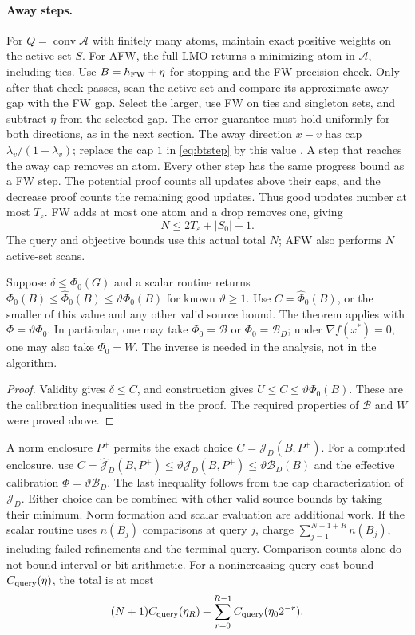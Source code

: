 \paragraph{Away steps.}\label{alg:afw}
For $Q=\operatorname{conv}\mathcal A$ with finitely many atoms, maintain
exact positive weights on the active set $S$.
For AFW, the full LMO returns a minimizing atom in $\mathcal A$, including ties.
Use $B=h_{\rm FW}+\eta$ for stopping and the FW precision check.
Only after that check passes,
scan the active set and compare its approximate away gap with the FW gap.
Select the larger, use FW on ties and singleton sets,
and subtract $\eta$ from the selected gap. The error guarantee must
hold uniformly for both directions, as in the next section.
The away direction $x-v$ has cap $\lambda_v/(1-\lambda_v)$; replace
the cap $1$ in \eqref{eq:btstep} by this value \cite{lacostejaggi}.
A step that reaches the away cap removes an atom. Every other step has
the same progress bound as a FW step. The potential proof counts all
updates above their caps, and the decrease proof counts the remaining
good updates. Thus good updates number at most $T_\varepsilon$.
FW adds at most one atom and a drop removes one, giving
\begin{equation}\label{eq:dropcount}
 N\le2T_\varepsilon+|S_0|-1.
\end{equation}
The query and objective bounds use this actual total $N$; AFW also
performs $N$ active-set scans.

\begin{corollary}\label{nloracle:energy}
Suppose $\delta\le\Phi_0(G)$ and a scalar routine returns
$\Phi_0(B)\le\widehat\Phi_0(B)\le\vartheta\Phi_0(B)$ for known
$\vartheta\ge1$. Use $C=\widehat\Phi_0(B)$, or the smaller of this
value and any other valid source bound. The theorem applies with
$\Phi=\vartheta\Phi_0$. In particular, one may take
$\Phi_0=\mathcal B$ or $\Phi_0=\mathcal B_D$; under $\nabla f(x^*)=0$, one may also take
$\Phi_0=W$. The inverse is needed in the analysis, not in the algorithm.
\end{corollary}
\begin{proof}
Validity gives $\delta\le C$, and construction gives
$U\le C\le\vartheta\Phi_0(B)$. These are the calibration inequalities
used in the proof. The required properties of $\mathcal B$ and $W$
were proved above.
\end{proof}

A norm enclosure $P^+$ permits the exact choice $C=\mathcal J_D(B,P^+)$.
For a computed enclosure, use
$C=\widehat{\mathcal J}_D(B,P^+)\le\vartheta\mathcal J_D(B,P^+)
\le\vartheta\mathcal B_D(B)$ and the effective calibration
$\Phi=\vartheta\mathcal B_D$. The last inequality follows from the
cap characterization of $\mathcal J_D$. Either choice can be combined with other
valid source bounds by taking their minimum. Norm formation and scalar
evaluation are additional work.
If the scalar routine uses $n(B_j)$ comparisons at query $j$, charge
$\sum_{j=1}^{N+1+R}n(B_j)$, including failed refinements and the terminal
query. Comparison counts alone do not bound interval or bit arithmetic.
For a nonincreasing query-cost bound $C_{\rm query}(\eta)$, the total is
at most
\[
 (N+1)C_{\rm query}(\eta_R)+\sum_{r=0}^{R-1}C_{\rm query}(\eta_0 2^{-r}).
\]

